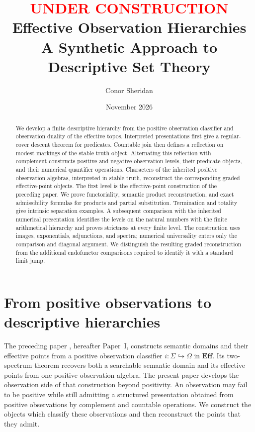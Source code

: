 \documentclass[11pt,a4paper]{article}
\title{\textcolor{red}{UNDER CONSTRUCTION} Effective Observation Hierarchies\\[4pt]\large A Synthetic Approach to Descriptive Set Theory}
\author{Conor Sheridan}
\date{November 2026}
\numberwithin{equation}{section}
\theoremstyle{definition}
\theoremstyle{remark}
\theoremstyle{plain}
\newcommand{\E}{\mathbf{Eff}}
\newcommand{\incl}{\hookrightarrow}
\begin{document}
\maketitle

\begin{abstract}
We develop a finite descriptive hierarchy from the positive observation
classifier and observation duality of the effective topos. Interpreted
presentations first give a regular-cover descent theorem for predicates.
Countable join then defines a reflection on modest markings of the stable
truth object. Alternating this reflection with complement constructs
positive and negative observation levels, their predicate objects, and
their numerical quantifier operations. Characters of the inherited
positive observation algebras, interpreted in stable truth, reconstruct
the corresponding graded effective-point objects. The first level is the
effective-point construction of the preceding paper. We prove functoriality,
semantic product reconstruction, and exact admissibility formulas for
products and partial substitution. Termination and totality give intrinsic
separation examples. A subsequent comparison with the inherited numerical
presentation identifies the levels on the natural numbers with the finite
arithmetical hierarchy and proves strictness at every finite level.
The construction uses images, exponentials, adjunctions, and spectra;
numerical universality enters only the comparison and diagonal argument.
We distinguish the resulting graded reconstruction from the additional
endofunctor comparisons required to identify it with a standard limit jump.
\end{abstract}

\tableofcontents

\section{From positive observations to descriptive hierarchies}
\label{sec:introduction}

The preceding paper \cite{sheridan}, hereafter Paper~I, constructs semantic
domains and their effective points from a positive observation classifier
$i:\Sigma\incl\Omega$ in $\E$. Its two-spectrum theorem recovers both a
searchable semantic domain and its effective points from one positive
observation algebra. The present paper develops the observation side of
that construction beyond positivity. An observation may fail to be
positive while still admitting a structured presentation obtained from
positive observations by complement and countable operations. We construct
the objects which classify these observations and then reconstruct the
points that they admit.
\end{document}
